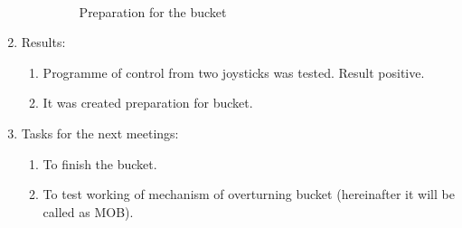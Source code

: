 \begin{enumerate}
\begin{enumerate}
	    \begin{figure}[H]
			\begin{minipage}[h]{0.2\linewidth}
				\center  
			\end{minipage}
			\begin{minipage}[h]{0.6\linewidth}
				\caption{Preparation for the bucket}
			\end{minipage}
		\end{figure}
		
	\end{enumerate}
	
	\item Results:
	\begin{enumerate}
		\item Programme of control from two joysticks was tested. Result positive.
		
		\item It was created preparation for bucket.
		
	\end{enumerate}
	
	\item Tasks for the next meetings:
	\begin{enumerate}
		\item To finish the bucket.
		
		\item To test working of mechanism of overturning bucket (hereinafter it will be called as MOB).
		
	\end{enumerate}     
\end{enumerate}
\fillpage

